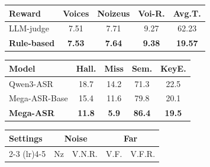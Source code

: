 \documentclass{llmxive}
\providecommand{\arraystretch}{1.05}
\begin{document}
\vspace{-2mm}
\begin{table}[t]
\centering
\small
\setlength{\tabcolsep}{3.8pt}
\renewcommand{\arraystretch}{0.92}
\begin{minipage}[t]{0.47\linewidth}
\centering
{}
\label{tab:rm}
\begin{tabular}{lcccc}
\toprule
\textbf{Reward} & \textbf{Voices} & \textbf{Noizeus} & \textbf{Voi-R.} & \textbf{Avg.T.} \\
\midrule
LLM-judge           & 7.51 & 7.71 & 9.27 &  62.23\\
\textbf{Rule-based} & \textbf{7.53} & \textbf{7.64} & \textbf{9.38} & \textbf{19.57} \\
\bottomrule
\end{tabular}
\vspace{1mm}
\label{tab:judge}
\vspace{-2mm}
\begin{tabular}{lcccc}
\toprule
\textbf{Model} & \textbf{Hall.} & \textbf{Miss} & \textbf{Sem.} & \textbf{KeyE.} \\
\midrule
Qwen3-ASR        & 18.7 & 14.2 & 71.3 & 22.5 \\
Mega-ASR-Base    & 15.4 & 11.6 & 79.8 & 20.1 \\
\textbf{Mega-ASR}& \textbf{11.8} & \textbf{5.9} & \textbf{86.4} & \textbf{19.5} \\
\bottomrule
\end{tabular}
\end{minipage}
\hfill
\begin{minipage}[t]{0.5\linewidth}
\centering
\setlength{\tabcolsep}{4.5pt}
\renewcommand{\arraystretch}{1.0}
\small
\vspace{0.5mm}
\vspace{2mm}
\label{tab:hp-alpha}
\begin{tabular}{lcccc}
\toprule
\multirow{2}{*}{\textbf{Settings}}  & \multicolumn{2}{c}{\textbf{Noise}} & \multicolumn{2}{c}{\textbf{Far}} \\
\cmidrule(lr){2-3} \cmidrule(lr){4-5}
 & Nz & V.N.R. & V.F. & V.F.R. \\

\end{tabular}
\end{minipage}
\end{table}
\end{document}
